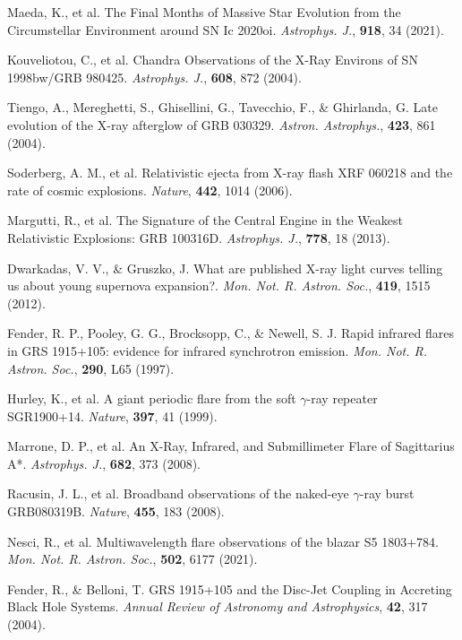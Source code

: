 \documentclass{nature_plusfigure}
\newcommand{\mn}{{Mon. Not. R. Astron. Soc.}}
\newcommand{\mnras}{\mn}
\newcommand{\apj}{{Astrophys. J.}}
\newcommand{\aap}{{Astron. Astrophys.}}
\newcommand{\nat}{{Nature}}
\newcommand{\araa}{Annual Review of Astronomy and Astrophysics}
\begin{document}
\begin{methods}
\begin{thebibliography}{10}
 Maeda, K., et al. The Final Months of Massive Star Evolution from the Circumstellar Environment around SN Ic 2020oi. \emph{\apj}, \textbf{918}, 34 (2021). 

 Kouveliotou, C., et al. Chandra Observations of the X-Ray Environs of SN 1998bw/GRB 980425. \emph{\apj}, \textbf{608}, 872 (2004). 

 Tiengo, A., Mereghetti, S., Ghisellini, G., Tavecchio, F., \& Ghirlanda, G. Late evolution of the X-ray afterglow of GRB 030329. \emph{\aap}, \textbf{423}, 861 (2004). 

 Soderberg, A. M., et al. Relativistic ejecta from X-ray flash XRF 060218 and the rate of cosmic explosions. \emph{\nat}, \textbf{442}, 1014 (2006). 

 Margutti, R., et al. The Signature of the Central Engine in the Weakest Relativistic Explosions: GRB 100316D. \emph{\apj}, \textbf{778}, 18 (2013). 

 Dwarkadas, V. V., \& Gruszko, J. What are published X-ray light curves telling us about young supernova expansion?. \emph{\mnras}, \textbf{419}, 1515 (2012). 



 Fender, R. P., Pooley, G. G., Brocksopp, C., \& Newell, S. J. Rapid infrared flares in GRS 1915+105: evidence for infrared synchrotron emission. \emph{\mnras}, \textbf{290}, L65 (1997). 

 Hurley, K., et al. A giant periodic flare from the soft $\gamma$-ray repeater SGR1900+14. \emph{\nat}, \textbf{397}, 41 (1999). 

 Marrone, D. P., et al. An X-Ray, Infrared, and Submillimeter Flare of Sagittarius A*. \emph{\apj}, \textbf{682}, 373 (2008). 

 Racusin, J. L., et al. Broadband observations of the naked-eye $\gamma$-ray burst GRB080319B. \emph{\nat}, \textbf{455}, 183 (2008). 

 Nesci, R., et al. Multiwavelength flare observations of the blazar S5 1803+784. \emph{\mnras}, \textbf{502}, 6177 (2021). 

 Fender, R., \& Belloni, T. GRS 1915+105 and the Disc-Jet Coupling in Accreting Black Hole Systems. \emph{\araa}, \textbf{42}, 317 (2004). 


\end{thebibliography}
\end{methods}
\end{document}
